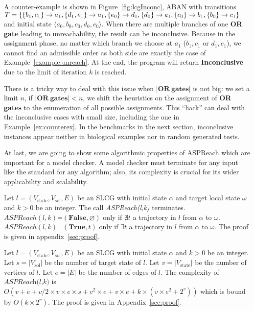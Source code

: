 \begin{example}\label{ex:counterex}
A counter-example is shown in Figure~\ref{fig:lcgInconc}, ABAN with transitions $T=\{\acm{b_1,c_1}{a_0}{a_1},\acm{d_1,e_1}{a_0}{a_1},\acm{e_0}{d_0}{d_1},\acm{d_0}{e_0}{e_1},\acm{c_0}{b_0}{b_1},\acm{b_0}{c_0}{c_1}\}$ and initial state $\langle a_0,b_0,c_0,d_0,e_0\rangle$.
When there are multiple branches of one \textbf{OR gate} leading to unreachability, the result can be inconclusive. 
Because in the assignment phase, no matter which branch we choose at $a_1$ ($b_1,c_1$ or $d_1,e_1$), we cannot find an admissible order as both side are exactly the case of Example~\ref{example:unreach}.
At the end, the program will return \textbf{Inconclusive} due to the limit of iteration $k$ is reached.
\end{example}

There is a tricky way to deal with this issue when $\mathbf{|OR\ gates|}$ is not big: we set a limit $n$, if $\mathbf{|OR\ gates|}<n$, we shift the heuristics on the assignment of \textbf{OR gates} to the enumeration of all possible assignments.
This ``hack'' can deal with the inconclusive cases with small size, including the one in Example~\ref{ex:counterex}.
In the benchmarks in the next section, inconclusive instances appear neither in biological examples nor in random generated tests.


At last, we are going to show some algorithmic properties of ASPReach which are important for a model checker.
A model checker must terminate for any input like the standard for any algorithm; also, its complexity is crucial for its wider applicability and scalability.

\begin{theorem}

    Let $l=(V_{\mathrm{state}}, V_{\mathrm{sol}}, E)$ be an SLCG with initial state $\alpha$ and target local state $\omega$ and $k > 0$ be an integer.
    The call \textit{ASPReach(l,k)} terminates.\\
    $ASPReach(l,k)$=$(\mathbf{False},\varnothing)$ only if $\nexists t$ a trajectory in $l$ from $\alpha$ to $\omega$.\\
    $ASPReach(l,k)$=$(\mathbf{True},t)$ only if $\exists t$ a trajectory in $l$ from $\alpha$ to $\omega$.
    The proof is given in appendix~\ref{sec:proof}.
\end{theorem}

\begin{theorem}
    Let $l=(V_{\mathrm{state}}, V_{\mathrm{sol}}, E)$ be an SLCG with initial state $\alpha$ and $k > 0$ be an integer.
    Let $s=|V_{\mathrm{sol}}|$ be the number of target state of $l$.
    Let $v = |V_{\mathrm{state}}|$ be the number of vertices of $l$.
    Let $e=|E|$ be the number of edges of $l$.
    The complexity of $\textit{ASPReach(l,k)}$ is $O(v + e + v/2 \times v \times e \times s + v^{2} \times e + v \times e + k \times (v \times e^{2} + 2^{v}))$ which is bound by $O(k \times 2^{v})$.
    The proof is given in Appendix~\ref{sec:proof}.
\end{theorem}

